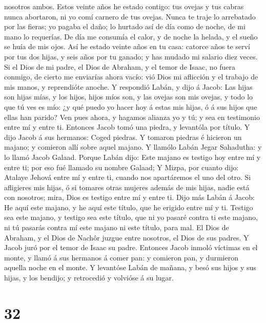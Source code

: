 nosotros ambos.  Estos veinte años he estado contigo: tus
ovejas y tus cabras nunca abortaron, ni yo comí carnero de tus ovejas.
 Nunca te traje lo arrebatado por las fieras; yo pagaba el
daño; lo hurtado así de día como de noche, de mi mano lo requerías.
 De día me consumía el calor, y de noche la helada, y el
sueño se huía de mis ojos.  Así he estado veinte años en tu
casa: catorce años te serví por tus dos hijas, y seis años por tu
ganado; y has mudado mi salario diez veces.  Si el Dios de
mi padre, el Dios de Abraham, y el temor de Isaac, no fuera conmigo, de
cierto me enviarías ahora vacío: vió Dios mi aflicción y el trabajo de
mis manos, y reprendióte anoche.  Y respondió Labán, y dijo
á Jacob: Las hijas son hijas mías, y los hijos, hijos míos son, y las
ovejas son mis ovejas, y todo lo que tú ves es mío: ¿y qué puedo yo
hacer hoy á estas mis hijas, ó á sus hijos que ellas han parido?
 Ven pues ahora, y hagamos alianza yo y tú; y sea en
testimonio entre mí y entre ti.  Entonces Jacob tomó una
piedra, y levantóla por título.  Y dijo Jacob á sus
hermanos: Coged piedras. Y tomaron piedras é hicieron un majano; y
comieron allí sobre aquel majano.  Y llamólo Labán Jegar
Sahadutha: y lo llamó Jacob Galaad.  Porque Labán dijo:
Este majano es testigo hoy entre mí y entre ti; por eso fué llamado su
nombre Galaad;  Y Mizpa, por cuanto dijo: Atalaye Jehová
entre mí y entre ti, cuando nos apartáremos el uno del otro.
 Si afligieres mis hijas, ó si tomares otras mujeres además
de mis hijas, nadie está con nosotros; mira, Dios es testigo entre mí y
entre ti.  Dijo más Labán á Jacob: He aquí este majano, y
he aquí este título, que he erigido entre mí y ti.  Testigo
sea este majano, y testigo sea este título, que ni yo pasaré contra ti
este majano, ni tú pasarás contra mí este majano ni este título, para
mal.  El Dios de Abraham, y el Dios de Nachôr juzgue entre
nosotros, el Dios de sus padres. Y Jacob juró por el temor de Isaac su
padre.  Entonces Jacob inmoló víctimas en el monte, y llamó
á sus hermanos á comer pan: y comieron pan, y durmieron aquella noche en
el monte.  Y levantóse Labán de mañana, y besó sus hijos y
sus hijas, y los bendijo; y retrocedió y volvióse á su lugar.

\hypertarget{section-31}{%
\section{32}\label{section-31}}

